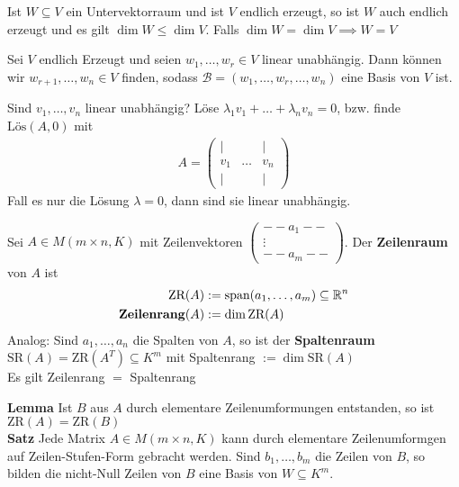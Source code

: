 Ist $W \subseteq V$ ein Untervektorraum und ist $V$ endlich erzeugt, so ist $W$ auch endlich erzeugt und es gilt $\dim W \leq \dim V$. Falls $\dim W = \dim V \implies W = V$\\
\begin{mdframed}
 Sei $V$ endlich Erzeugt und seien $w_1, \ldots, w_r \in V$ linear unabhängig. Dann können wir $w_{r+1}, \ldots, w_n \in V$ finden, sodass $\mathcal{B} = (w_1, \ldots, w_r, \ldots, w_n)$ eine Basis von $V$ ist. 
\end{mdframed}
\begin{mdframed}
Sind $v_1, \ldots, v_n$ linear unabhängig? \quad Löse $\lambda_{1} v_{1} + \ldots + \lambda_{n} v_{n} = 0$, bzw. finde $\text{Lös}(A,0)$ mit 
\begin{align*}
    A = \begin{pmatrix}
    | & & |\\
    v_1 & \ldots & v_n\\
    | & & |
    \end{pmatrix}
\end{align*}
Fall es nur die Lösung $\lambda = 0$, dann sind sie linear unabhängig.
\end{mdframed}
\begin{mdframed}
Sei $A \in M(m\times n,K)$ mit Zeilenvektoren $\begin{pmatrix}
--a_{1}-- \\ \vdots \\	 --a_{m}--
\end{pmatrix}$. \quad Der \textbf{Zeilenraum} von $A$ ist 
\begin{align*}
    \text{ZR}(A) &:= \text{span}(a_1, \ldots, a_m) \subseteq \mathbb{R}^n\\
    \text{\textbf{Zeilenrang}}(A) &:= \dim \text{ZR}(A)
\end{align*}
Analog: \quad Sind $a_1, \ldots, a_n$ die Spalten von $A$, so ist der \textbf{Spaltenraum} $\text{SR}(A) = \text{ZR}(A^T) \subseteq K^m$ mit Spaltenrang $:= \dim \text{SR}(A)$\\
Es gilt Zeilenrang $=$ Spaltenrang
\end{mdframed}
\textbf{Lemma} Ist $B$ aus $A$ durch elementare Zeilenumformungen entstanden, so ist $\text{ZR}(A) = \text{ZR}(B)$\\
\textbf{Satz} Jede Matrix $A \in M(m\times n,K)$ kann durch elementare Zeilenumformgen auf Zeilen-Stufen-Form gebracht werden. Sind $b_1, \ldots, b_m$ die Zeilen von $B$, so bilden die nicht-Null Zeilen von $B$ eine Basis von $W \subseteq K^m$.\\
